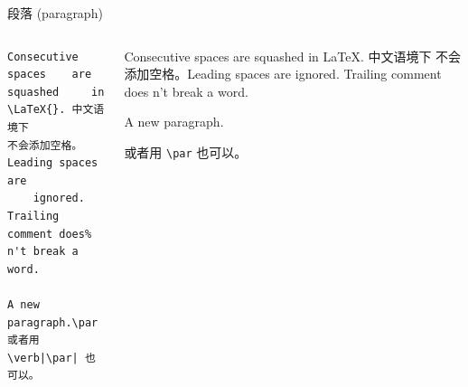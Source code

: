 \begin{frame}[fragile]{段落 (paragraph)}
  
  \vspace{1em}
  \pause
  \begin{columns}
      \begin{column}{0.5\textwidth}
          \begin{verbatim}
Consecutive spaces    are
squashed     in \LaTeX{}. 中文语境下
不会添加空格。Leading spaces are
    ignored. Trailing comment does%
n't break a word.

A new paragraph.\par
或者用 \verb|\par| 也可以。
          \end{verbatim}
      \end{column}
      \begin{column}{0.45\textwidth}
          \setlength{\parskip}{.5em}\small
  Consecutive spaces    are
  squashed     in \LaTeX{}. 中文语境下
  不会添加空格。Leading spaces are
      ignored. Trailing comment does%
  n't break a word.
  
  A new paragraph.\par
  或者用 \verb|\par| 也可以。
      \end{column}
  \end{columns}
\end{frame}
  
